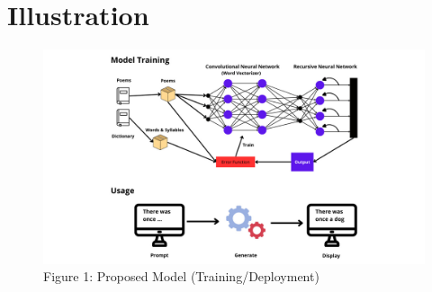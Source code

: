 \documentclass{article} %
\begin{document}
\section{Illustration}
\begin{figure}[h]
    \begin{center}
    \includegraphics[width=\textwidth]{Figs/Illustration.jpg}
    \end{center}
    \caption{Figure 1: Proposed Model (Training/Deployment)}
    \end{figure}
\end{document}
